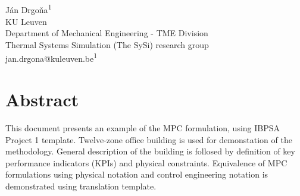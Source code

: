 \documentclass[10pt]{extarticle}
\begin{document}
	
\begin{center}
\vspace{0.2in}
\\[14pt]

{\fontsize{11pt}{1.2em}\selectfont
 J\'an Drgo\v na\textsuperscript{1}
\\[11pt]

KU Leuven\\
Department of Mechanical Engineering - TME Division\\
Thermal Systems Simulation  (The SySi) research group  \\[11pt]

jan.drgona@kuleuven.be\textsuperscript{1}\\
}
\end{center}

\vspace{0.5cm}


\section*{Abstract}

This document presents an example of the MPC formulation, using IBPSA Project 1 template.
Twelve-zone office building is used for demonstation of the methodology.
General description of the building is follosed by definition of key performance indicators (KPIs) and physical constraints.
Equivalence of MPC formulations using physical notation and control engineering notation is demonstrated using translation template.
\end{document}
